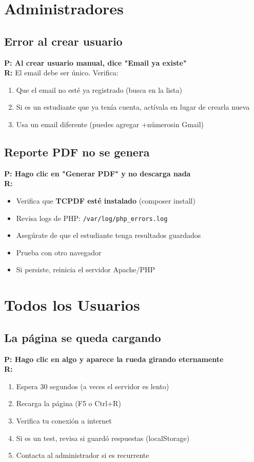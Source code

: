 \documentclass[12pt, a4paper]{report}
\begin{document}
\section{Administradores}

\subsection{Error al crear usuario}
\textbf{P: Al crear usuario manual, dice "Email ya existe"}\\
\textbf{R:} El email debe ser único. Verifica:
\begin{enumerate}
    \item Que el email no esté ya registrado (busca en la lista)
    \item Si es un estudiante que ya tenía cuenta, actívala en lugar de crearla nueva
    \item Usa un email diferente (puedes agregar +númerosin Gmail)
\end{enumerate}

\subsection{Reporte PDF no se genera}
\textbf{P: Hago clic en "Generar PDF" y no descarga nada}\\
\textbf{R:}
\begin{itemize}
    \item Verifica que \textbf{TCPDF esté instalado} (composer install)
    \item Revisa logs de PHP: \texttt{/var/log/php\_errors.log}
    \item Asegúrate de que el estudiante tenga resultados guardados
    \item Prueba con otro navegador
    \item Si persiste, reinicia el servidor Apache/PHP
\end{itemize}

\section{Todos los Usuarios}

\subsection{La página se queda cargando}
\textbf{P: Hago clic en algo y aparece la rueda girando eternamente}\\
\textbf{R:}
\begin{enumerate}
    \item Espera 30 segundos (a veces el servidor es lento)
    \item Recarga la página (F5 o Ctrl+R)
    \item Verifica tu conexión a internet
    \item Si es un test, revisa si guardó respuestas (localStorage)
    \item Contacta al administrador si es recurrente
\end{enumerate}
\end{document}
